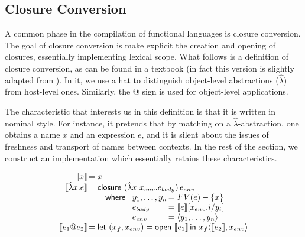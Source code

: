 \documentclass[9pt,authoryear]{sigplanconf}
\begin{document}
\subsection{Closure Conversion\label{closureSec}}

%
A common phase in the compilation of functional languages is closure conversion. 
    The goal of closure conversion is make explicit the creation and opening of closures, 
    essentially implementing lexical scope. 
    What follows is a definition of closure conversion, as can be found in a textbook 
    (in fact this version is slightly adapted from \citet{guillemette_type-preserving_2007}).
    In it, we use a hat to distinguish
    object-level abstractions ($ \hat\lambda $) from host-level ones.
    Similarly, the $ @ $ sign is used for object-level applications. %


%
    The characteristic that interests us in this definition is that it is written in nominal style.
    For instance, it pretends that by matching on a $ \hat \lambda $-abstraction, one obtains a name
    $ x $ and an expression $ e $, and it is silent about the issues of freshness and
    transport of names between contexts. In the rest of the section, we construct an
    implementation which essentially retains
    these characteristics.


\[ 
\begin{array}{r@{\,}l}
  \llbracket x \rrbracket &= x \\
  \llbracket \hat\lambda x. e \rrbracket &= \mathsf{closure}~(\hat\lambda x~x_\mathnormal{env}. e_\mathnormal{body})\, e_\mathnormal{env} \\
                                         &\quad \quad \mathsf{where}~\begin{array}[t]{l@{\,}l}
                                                                  y_1,\ldots,y_n & = FV(e)-\{x\} \\
                                                                  e_\mathnormal{body} & = \llbracket e \rrbracket[x_{env}.i/y_i] \\
                                                                  e_\mathnormal{env} & = \langle y_1,\ldots,y_n \rangle
                                                               \end{array}\\
  \llbracket e_1@e_2 \rrbracket &= \mathsf{let}~(x_f,x_\mathnormal{env}) = \mathsf{open}~\llbracket e_1 \rrbracket \, \mathsf{in}~ x_f \langle \llbracket e_2 \rrbracket , x_\mathnormal{env} \rangle
\end{array} \]
\end{document}
